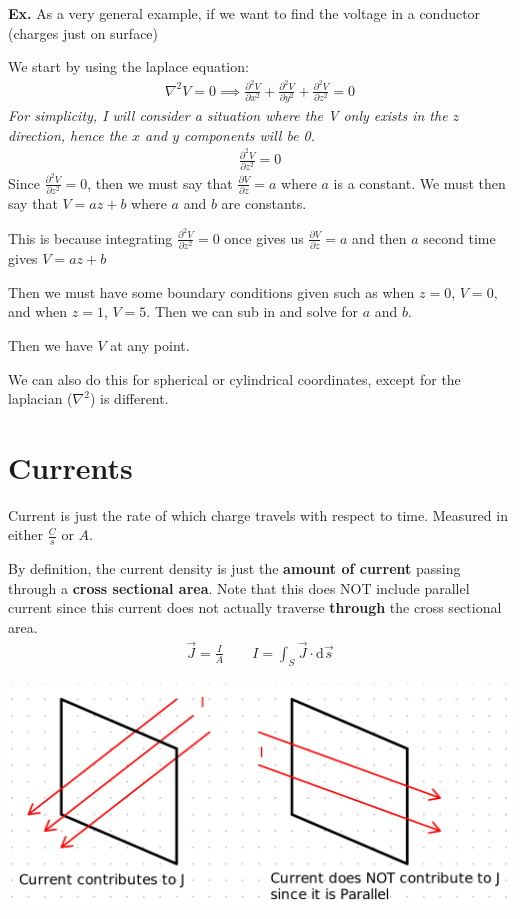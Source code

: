 \documentclass[12pt,letterpaper]{article} \usepackage{amsmath} \usepackage{graphicx} \usepackage[margin=1in]{geometry} \usepackage{longtable}  \usepackage{amssymb}
\begin{document}
	\begin{mdframed}
		\textbf{Ex. } As a very general example, if we want to find the voltage in a conductor (charges just on surface)
		
		We start by using the laplace equation:
		\begin{align*}
			\nabla^2 V = 0 \implies \frac{\partial^2 V}{\partial x^2} + \frac{\partial^2 V}{\partial y^2} + \frac{\partial^2 V}{\partial z^2} = 0
		\end{align*}
		\textit{For simplicity, I will consider a situation where the V only exists in the $z$ direction, hence the $x$ and $y$ components will be 0.}
		\begin{align*}
			\frac{\partial^2 V}{\partial z^2} = 0
		\end{align*}
		Since $\frac{\partial^2 V}{\partial z^2}=0$, then we must say that $\frac{\partial V}{\partial z} = a$ where $a$ is a constant. We must then say that $V = az+b$ where $a$ and $b$ are constants.
		
		This is because integrating $\frac{\partial^2 V}{\partial z^2}=0$ once gives us $\frac{\partial V}{\partial z}=a$ and then $a$ second time gives $V=az+b$
		
		Then we must have some boundary conditions given such as when $z=0$, $V=0$, and when $z=1$, $V=5$. Then we can sub in and solve for $a$ and $b$.
		
		Then we have $V$ at any point.
	\end{mdframed}

	We can also do this for spherical or cylindrical coordinates, except for the laplacian ($\nabla^2$) is different.
	
	\section{Currents}
	Current is just the rate of which charge travels with respect to time. Measured in either $\frac{C}{s}$ or $A$.
	
	By definition, the current density is just the \textbf{amount of current} passing through a \textbf{cross sectional area}. Note that this does NOT include parallel current since this current does not actually traverse \textbf{through} the cross sectional area.
	\begin{align*}
		\vec J=\frac{I}{A} \qquad I = \int_S \vec J \cdot \mathrm d \vec s
	\end{align*}

	\begin{center}
		\includegraphics[width=0.7\linewidth]{current-density-contirbutions}
	\end{center}
\end{document}
